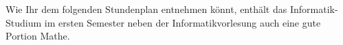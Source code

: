 Wie Ihr dem folgenden Stundenplan entnehmen könnt, enthält das Informatik-Studium im ersten
Semester neben der Informatikvorlesung auch eine gute Portion Mathe.
\vspace{-0.5cm}
\begin{center}



\end{center}

